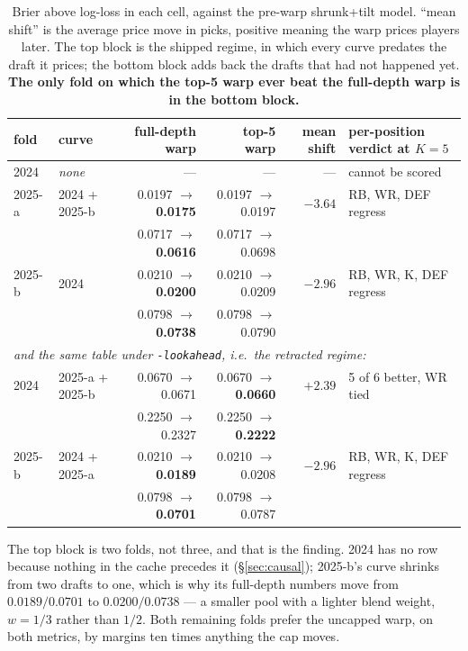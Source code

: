 \documentclass[10pt,a4paper]{article}
\theoremstyle{plain}
\theoremstyle{definition}
\theoremstyle{remark}
\newcommand{\code}[1]{\texttt{\small #1}}
\begin{document}
\begin{table}[htbp]
\centering
\small
\begin{tabular}{llrrrl}
\toprule
fold & curve & full-depth warp & top-5 warp & mean shift & per-position verdict at $K=5$ \\
\midrule
2024   & \emph{none} & --- & --- & --- & cannot be scored \\
\midrule
2025-a & 2024 + 2025-b & 0.0197 $\to$ \textbf{0.0175} & 0.0197 $\to$ 0.0197 & $-3.64$ & RB, WR, DEF regress \\
       &               & 0.0717 $\to$ \textbf{0.0616} & 0.0717 $\to$ 0.0698 &         & \\
2025-b & 2024          & 0.0210 $\to$ \textbf{0.0200} & 0.0210 $\to$ 0.0209 & $-2.96$ & RB, WR, K, DEF regress \\
       &               & 0.0798 $\to$ \textbf{0.0738} & 0.0798 $\to$ 0.0790 &         & \\
\midrule
\multicolumn{6}{l}{\emph{and the same table under \code{-lookahead}, i.e.\ the retracted regime:}} \\
2024   & 2025-a + 2025-b & 0.0670 $\to$ 0.0671 & 0.0670 $\to$ \textbf{0.0660} & $+2.39$ & 5 of 6 better, WR tied \\
       &                 & 0.2250 $\to$ 0.2327 & 0.2250 $\to$ \textbf{0.2222} &         & \\
2025-b & 2024 + 2025-a   & 0.0210 $\to$ \textbf{0.0189} & 0.0210 $\to$ 0.0208 & $-2.96$ & RB, WR, K, DEF regress \\
       &                 & 0.0798 $\to$ \textbf{0.0701} & 0.0798 $\to$ 0.0787 &         & \\
\bottomrule
\end{tabular}
\caption{Brier above log-loss in each cell, against the pre-warp shrunk+tilt model. ``mean
shift'' is the average price move in picks, positive meaning the warp prices players later.
The top block is the shipped regime, in which every curve predates the draft it prices; the
bottom block adds back the drafts that had not happened yet. \textbf{The only fold on which
the top-5 warp ever beat the full-depth warp is in the bottom block.}}
\label{tab:warpfolds}
\end{table}

The top block is two folds, not three, and that is the finding. 2024 has no row because
nothing in the cache precedes it (\S\ref{sec:causal}); 2025-b's curve shrinks from two
drafts to one, which is why its full-depth numbers move from $0.0189 / 0.0701$ to
$0.0200 / 0.0738$ --- a smaller pool with a lighter blend weight, $w = 1/3$ rather than
$1/2$. Both remaining folds prefer the uncapped warp, on both metrics, by margins ten times
anything the cap moves.
\end{document}
